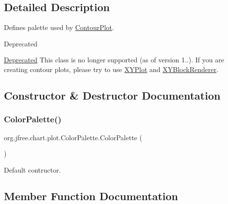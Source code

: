 \subsection{Detailed Description}
Defines palette used by \mbox{\hyperlink{classorg_1_1jfree_1_1chart_1_1plot_1_1_contour_plot}{Contour\+Plot}}.

\begin{DoxyRefDesc}{Deprecated}
\item[\mbox{\hyperlink{deprecated__deprecated000053}{Deprecated}}]This class is no longer supported (as of version 1..). If you are creating contour plots, please try to use \mbox{\hyperlink{classorg_1_1jfree_1_1chart_1_1plot_1_1_x_y_plot}{X\+Y\+Plot}} and \mbox{\hyperlink{}{X\+Y\+Block\+Renderer}}. \end{DoxyRefDesc}


\subsection{Constructor \& Destructor Documentation}
\mbox{\label{classorg_1_1jfree_1_1chart_1_1plot_1_1_color_palette_af08d4aac933445b2b380d14d3bbd22f9}} 
\subsubsection{\texorpdfstring{Color\+Palette()}{ColorPalette()}}
{\footnotesize\ttfamily org.\+jfree.\+chart.\+plot.\+Color\+Palette.\+Color\+Palette (\begin{DoxyParamCaption}{ }\end{DoxyParamCaption})}

Default contructor. 

\subsection{Member Function Documentation}
\mbox{\label{classorg_1_1jfree_1_1chart_1_1plot_1_1_color_palette_a558072d493d70c42cddaf6810cf09eba}} 
